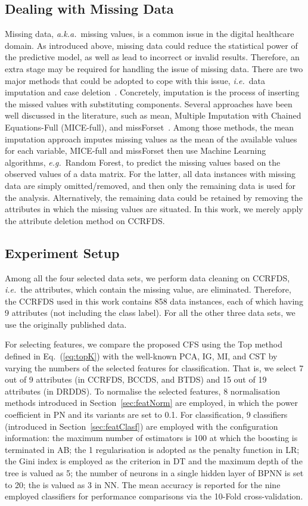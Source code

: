 \documentclass{article}
\newcommand{\zzie}{\emph{i.e.}~}
\newcommand{\zzeg}{\emph{e.g.}~}
\newcommand{\zzaka}{\emph{a.k.a.}~}
\newcommand*{\1}{\textcolor{magenta}}
\begin{document}
	\subsection{Dealing with Missing Data}\label{sec:missingvalues}
	Missing data, \zzaka missing values, is a common issue in the digital healthcare domain. As introduced above, missing data could reduce the statistical power of the predictive model, as well as lead to incorrect or invalid results. Therefore, an extra stage may be required for handling the issue of missing data. There are two major methods that could be adopted to cope with this issue, \zzie data imputation and case deletion~\cite{kang2013prevention}. Concretely, imputation is the process of inserting the missed values with substituting components. Several approaches have been well discussed in the literature, such as mean, Multiple Imputation with Chained Equations-Full (MICE-full), and missForset~\cite{luo2016using}. Among those methods, the mean imputation approach imputes missing values as the mean of the available values for each variable, MICE-full and missForset then use Machine Learning algorithms, \zzeg Random Forest, to predict the missing values based on the observed values of a data matrix. For the latter, all data instances with missing data are simply omitted/removed, and then only the remaining data is used for the analysis. Alternatively, the remaining data could be retained by removing the attributes in which the missing values are situated. In this work, we merely apply the attribute deletion method on CCRFDS.
	
	\subsection{Experiment Setup}


	Among all the four selected data sets, we perform data cleaning on CCRFDS, \zzie the attributes, which contain the missing value, are eliminated. Therefore, the CCRFDS used in this work contains 858 data instances, each of which having 9 attributes (not including the class label). For all the other three data sets, we use the originally published data.
	
	For selecting features, we compare the proposed CFS using the Top method defined in Eq.~(\ref{eq:topK}) with the well-known PCA, IG, MI, and CST by varying the numbers of the selected features for classification. That is, we select 7 out of 9 attributes (in CCRFDS, BCCDS, and BTDS) and 15 out of 19 attributes (in DRDDS). To normalise the selected features, 8 normalisation methods introduced in Section~\ref{sec:featNorm} are employed, in which the power coefficient in PN and its variants are set to 0.1. For classification, 9 classifiers (introduced in Section~\ref{sec:featClasf}) are employed with the configuration information: the maximum number of estimators is 100 at which the boosting is terminated in AB; the 1 regularisation is adopted as the penalty function in LR; the Gini index is employed as the criterion in DT and the maximum depth of the tree is valued as 5; the number of neurons in a single hidden layer of BPNN is set to 20; the  is valued as 3 in NN. The mean accuracy is reported for the nine employed classifiers for performance comparisons via the 10-Fold cross-validation.
	
\end{document}
